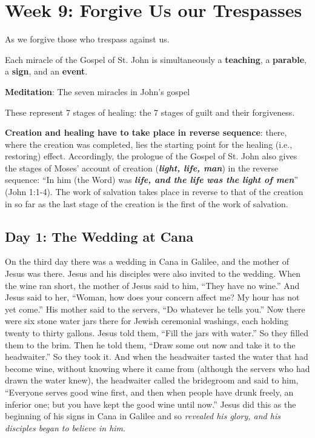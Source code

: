 \chapter{Week 9: Forgive Us our Trespasses} 

As we forgive those who trespass against us.

\begin{quotex}
Each miracle of the Gospel of St. John is simultaneously a \textbf{teaching}, a \textbf{parable}, a \textbf{sign}, and an \textbf{event}.

\end{quotex}

\textbf{Meditation}: The seven miracles in John's gospel

These represent 7 stages of healing: the 7 stages of guilt and their forgiveness.

\begin{quotex}
\textbf{Creation and healing have to take place in reverse sequence}: there, where the creation was completed, lies the starting point for the healing (i.e., restoring) effect. Accordingly, the prologue of the Gospel of St. John also gives the stages of Moses' account of creation (\textbf{\emph{light, life, man}}) in the reverse sequence: ``In him (the Word) was \textbf{\emph{life, and the life was the \textbf{light} of \textbf{men}}}'' (John 1:1-4). The work of salvation takes place in reverse to that of the creation in so far as the last stage of the creation is the first of the work of salvation.

\end{quotex}

\section{Day 1: The Wedding at Cana}

On the third day there was a wedding in Cana in Galilee, and the mother of Jesus was there. Jesus and his disciples were also invited to the wedding. When the wine ran short, the mother of Jesus said to him, ``They have no wine.'' And Jesus said to her, ``Woman, how does your concern affect me? My hour has not yet come.'' His mother said to the servers, ``Do whatever he tells you.'' Now there were six stone water jars there for Jewish ceremonial washings, each holding twenty to thirty gallons. Jesus told them, ``Fill the jars with water.'' So they filled them to the brim. Then he told them, ``Draw some out now and take it to the headwaiter.'' So they took it. And when the headwaiter tasted the water that had become wine, without knowing where it came from (although the servers who had drawn the water knew), the headwaiter called the bridegroom and said to him, ``Everyone serves good wine first, and then when people have drunk freely, an inferior one; but you have kept the good wine until now.'' Jesus did this as the beginning of his signs in Cana in Galilee and so \emph{revealed his glory, and his disciples began to believe in him}.


